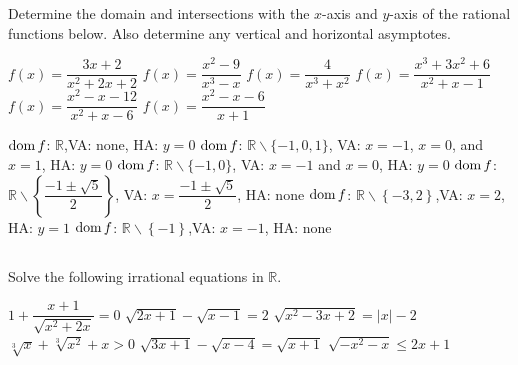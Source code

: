 \begin{Exercise} Determine the domain and intersections with the $x$-axis and $y$-axis of the rational functions below. Also determine any vertical and horizontal asymptotes.
	\begin{multicols}{2}
	\Question[difficulty = 1] $f(x)=\dfrac{3x+2}{x^2+2x+2}$
	\Question[difficulty = 1] $f(x)=\dfrac{x^2-9}{x^3-x}$
	\Question[difficulty = 1] $f(x)=\dfrac{4}{x^3+x^2}$
	\Question[difficulty = 1] $f(x)=\dfrac{x^3 + 3x^2+6}{x^2+x-1}$
	\ifanalysis\Question[difficulty = 1]\fi\ifcalculus\Question[difficulty = 2]\fi $f(x)=\dfrac{x^2-x-12}{x^2+x-6}$
	\Question[difficulty = 1] $f(x)=\dfrac{x^2-x-6}{x+1}$
	\EndCurrentQuestion
    \end{multicols}

\end{Exercise}

\begin{Answer}\phantom{}
    
    	\Question $\text{dom}{\,} f$: $\mathbb{R}$,\quad VA: none, \quad  HA: $y = 0$
    	\Question $\text{dom}{\,} f$: $\mathbb{R}\backslash \{-1,0,1\}$, \quad  VA: $x = -1$, $x = 0$, and $x = 1$, \quad  HA: $y = 0$
    	\Question $\text{dom}{\,} f$: $\mathbb{R}\backslash \{-1,0\}$, \quad VA: $x = -1$ and $x = 0$, \quad HA: $y = 0$
    	\Question $\text{dom}{\,} f$: $\mathbb{R}\backslash \left\{\dfrac{-1 \pm \sqrt{5}}{2} \right\}$, \quad VA: $x = \dfrac{-1 \pm \sqrt{5}}{2}$, \quad HA: none
    	\Question $\text{dom}{\,} f$: $\mathbb{R}\backslash \left\{-3,2\right\}$,\quad VA: $x=2$, \quad  HA: $y = 1$ 
    	\Question $\text{dom}{\,} f$: $\mathbb{R}\backslash \left\{-1\right\}$,\quad VA: $x=-1$, \quad  HA: none 
\end{Answer}
    
\ifanalysis\pagebreak\fi    
\subsection*{}

\begin{Exercise} Solve the following irrational equations in $\mathbb{R}$. 
   	\begin{multicols}{2}
   	\Question[difficulty = 1] $1 + \dfrac{x+1}{\sqrt{x^2+2x}} = 0$
   	\Question[difficulty = 2] $\sqrt{2x+1} - \sqrt{x-1} = 2 $
   	\Question[difficulty = 2] $\sqrt{x^2-3x+2} = |x|-2$
   	\ifanalysis\Question[difficulty = 1]\fi\ifcalculus\Question[difficulty = 2]\fi $\sqrt[3]{x} + \sqrt[3]{x^2} + x >0$
   	\Question[difficulty = 2] $\sqrt{3x+1} - \sqrt{x-4} = \sqrt{x+1} $
   	\Question[difficulty = 3] $\sqrt{-x^2-x} \leq 2x+1 $
   	\EndCurrentQuestion
   	\end{multicols}

\end{Exercise}

